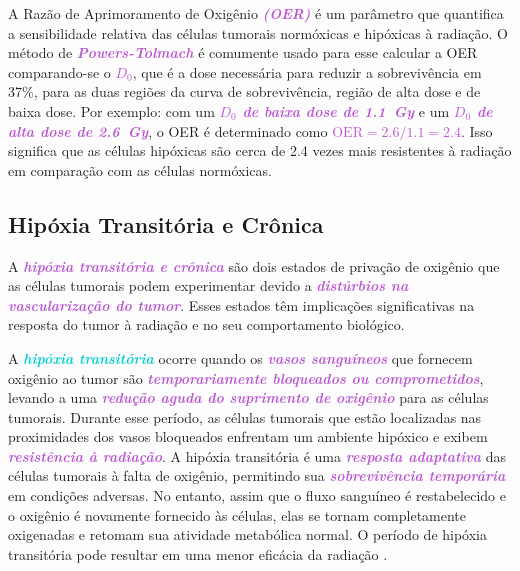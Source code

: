 \documentclass[11pt,a4paper]{article}
\newcounter{exemplo}
\begin{document}
	A Razão de Aprimoramento de Oxigênio \textcolor{MediumOrchid}{\textbf{\textit{(OER)}}} é um parâmetro que quantifica a sensibilidade relativa das células tumorais normóxicas e hipóxicas à radiação. O método de \textcolor{MediumOrchid}{\textbf{\textit{Powers-Tolmach}}} é comumente usado para esse calcular a OER comparando-se o \textcolor{MediumOrchid}{\textbf{\textit{$D_0$}}}, que é a dose necessária para reduzir a sobrevivência em 37\%, para as duas regiões da curva de sobrevivência, região de alta dose e de baixa dose. Por exemplo: com um \textcolor{MediumOrchid}{\textbf{\textit{$D_0$ de baixa dose de \SI{1.1}{\gray}}}} e um \textcolor{MediumOrchid}{\textbf{\textit{$D_0$ de alta dose de \SI{2.6}{\gray}}}}, o OER é determinado como \textcolor{MediumOrchid}{\textbf{\textit{$\text{OER} = 2.6/1.1 = 2.4$}}}. Isso significa que as células hipóxicas são cerca de 2.4 vezes mais resistentes à radiação em comparação com as células normóxicas.

\subsection*{Hipóxia Transitória e Crônica}

	A \textcolor{MediumOrchid}{\textbf{\textit{hipóxia transitória e crônica}}} são dois estados de privação de oxigênio que as células tumorais podem experimentar devido a \textcolor{MediumOrchid}{\textbf{\textit{distúrbios na vascularização do tumor}}}. Esses estados têm implicações significativas na resposta do tumor à radiação e no seu comportamento biológico.

	A \textcolor{DarkTurquoise}{\textbf{\textit{hipóxia transitória}}} ocorre quando os \textcolor{MediumOrchid}{\textbf{\textit{vasos sanguíneos}}} que fornecem oxigênio ao tumor são \textcolor{MediumOrchid}{\textbf{\textit{temporariamente bloqueados ou comprometidos}}}, levando a uma \textcolor{MediumOrchid}{\textbf{\textit{redução aguda do suprimento de oxigênio}}} para as células tumorais. Durante esse período, as células tumorais que estão localizadas nas proximidades dos vasos bloqueados enfrentam um ambiente hipóxico e exibem \textcolor{MediumOrchid}{\textbf{\textit{resistência à radiação}}}. A hipóxia transitória é uma \textcolor{MediumOrchid}{\textbf{\textit{resposta adaptativa}}} das células tumorais à falta de oxigênio, permitindo sua \textcolor{MediumOrchid}{\textbf{\textit{sobrevivência temporária}}} em condições adversas. No entanto, assim que o fluxo sanguíneo é restabelecido e o oxigênio é novamente fornecido às células, elas se tornam completamente oxigenadas e retomam sua atividade metabólica normal. O período de hipóxia transitória pode resultar em uma menor eficácia da radiação .
\end{document}
